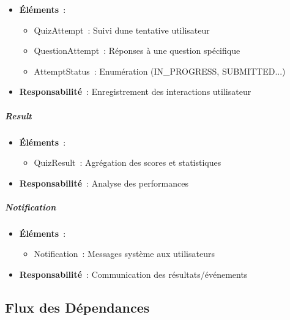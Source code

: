 \documentclass[12pt,a4paper,twoside]{report}
\begin{document}
\begin{itemize}
\item
  \textbf{Éléments}~:

  \begin{itemize}
  \item
    QuizAttempt~: Suivi d\textquotesingle une tentative utilisateur
  \item
    QuestionAttempt~: Réponses à une question spécifique
  \item
    AttemptStatus~: Enumération (IN\_PROGRESS, SUBMITTED...)
  \end{itemize}
\item
  \textbf{Responsabilité}~: Enregistrement des interactions utilisateur
\end{itemize}

\hypertarget{result}{%
\subparagraph{Result}\label{result}}

\begin{itemize}
\item
  \textbf{Éléments}~:

  \begin{itemize}
  \item
    QuizResult~: Agrégation des scores et statistiques
  \end{itemize}
\item
  \textbf{Responsabilité}~: Analyse des performances
\end{itemize}

\hypertarget{notification}{%
\subparagraph{Notification}\label{notification}}

\begin{itemize}
\item
  \textbf{Éléments}~:

  \begin{itemize}
  \item
    Notification~: Messages système aux utilisateurs
  \end{itemize}
\item
  \textbf{Responsabilité}~: Communication des résultats/événements
\end{itemize}

\hypertarget{flux-des-duxe9pendances}{%
\subsection{Flux des Dépendances}\label{flux-des-duxe9pendances}}
\end{document}
